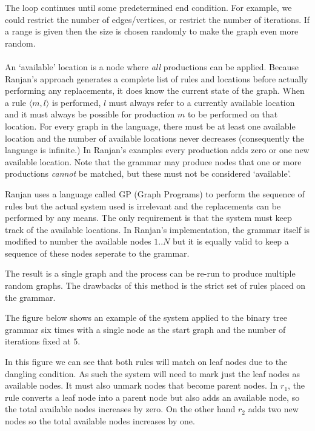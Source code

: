   The loop continues until some predetermined end condition. For example, we could restrict the number of edges/vertices, or restrict the number of iterations. If a range is given then the size is chosen randomly to make the graph even more random.

  \paragraph{}

  An `available' location is a node where \emph{all} productions can be applied. Because Ranjan's approach generates a complete list of rules and locations before actually performing any replacements, it does know the current state of the graph. When a rule $\langle m,l \rangle$ is performed, $l$ must always refer to a currently available location and it must always be possible for production $m$ to be performed on that location. For every graph in the language, there must be at least one available location and the number of available locations never decreases (consequently the language is infinite.) In Ranjan's examples every production adds zero or one new available location. Note that the grammar may produce nodes that one or more productions \emph{cannot} be matched, but these must not be considered `available'.
  
  Ranjan uses a language called GP (Graph Programs) to perform the sequence of rules but the actual system used is irrelevant and the replacements can be performed by any means. The only requirement is that the system must keep track of the available locations. In Ranjan's implementation, the grammar itself is modified to number the available nodes $1..N$ but it is equally valid to keep a sequence of these nodes seperate to the grammar.

  The result is a single graph and the process can be re-run to produce multiple random graphs. The drawbacks of this method is the strict set of rules placed on the grammar.

  

  The figure below shows an example of the system applied to the binary tree grammar six times with a single node as the start graph and the number of iterations fixed at $5$.

  

  In this figure we can see that both rules will match on leaf nodes due to the dangling condition. As such the system will need to mark just the leaf nodes as available nodes. It must also unmark nodes that become parent nodes. In $r_1$, the rule converts a leaf node into a parent node but also adds an available node, so the total available nodes increases by zero. On the other hand $r_2$ adds two new nodes so the total available nodes increases by one.

